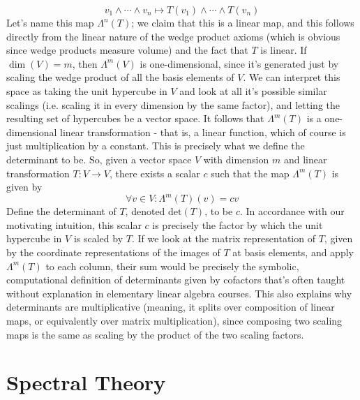 \documentclass{article}
\newcommand{\nn}{\leavevmode \newline \newline}
\begin{document}
	$$ v_1 \wedge \cdots \wedge v_n \mapsto T(v_1) \wedge \cdots \wedge T(v_n) $$
Let's name this map $ \Lambda^n(T) $; we claim that this is a linear map, and this follows directly from the linear nature of the wedge product axioms (which is obvious since wedge products measure volume) and the fact that $ T $ is linear. If $ \dim(V) = m $, then $ \Lambda^m(V) $ is one-dimensional, since it's generated just by scaling the wedge product of all the basis elements of $ V $. We can interpret this space as taking the unit hypercube in $ V $ and look at all it's possible similar scalings (i.e. scaling it in every dimension by the same factor), and letting the resulting set of hypercubes be a vector space. It follows that $ \Lambda^m(T) $ is a one-dimensional linear transformation - that is, a linear function, which of course is just multiplication by a constant. This is precisely what we define the determinant to be.
\nn
So, given a vector space $ V $ with dimension $ m $ and linear transformation $ T: V \rightarrow V $, there exists a scalar $ c $ such that the map $ \Lambda^m(T) $ is given by
    $$ \forall v \in V: \Lambda^m(T)(v) = c v $$
Define the determinant of $ T $, denoted $ \text{det}(T) $, to be $ c $. In accordance with our motivating intuition, this scalar $ c $ is precisely the factor by which the unit hypercube in $ V $ is scaled by $ T $. If we look at the matrix representation of $ T $, given by the coordinate representations of the images of $ T $ at basis elements, and apply $ \Lambda^m(T) $ to each column, their sum would be precisely the symbolic, computational definition of determinants given by cofactors that's often taught without explanation in elementary linear algebra courses. This also explains why determinants are multiplicative (meaning, it splits over composition of linear maps, or equivalently over matrix multiplication), since composing two scaling maps is the same as scaling by the product of the two scaling factors.

\section{Spectral Theory}
\end{document}
